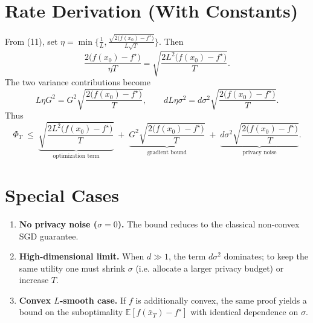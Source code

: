 \documentclass{article}
\newcommand{\E}{\mathbb{E}}
\begin{document}
\section*{Rate Derivation (With Constants)}
From (11), set $\eta = \min\big\{\frac{1}{L},\frac{\sqrt{2\big(f(x_{0})-f^{\star}\big)}}{L\sqrt{T}}\big\}$.  
Then
\[
\frac{2\big(f(x_{0})-f^{\star}\big)}{\eta T}
   = \sqrt{\frac{2L^{2}\big(f(x_{0})-f^{\star}\big)}{T}}.
\]
The two variance contributions become
\[
L\eta G^{2}= G^{2}\sqrt{ \frac{2\big(f(x_{0})-f^{\star}\big)}{T}},\qquad
dL\eta\sigma^{2}= d\sigma^{2}\sqrt{ \frac{2\big(f(x_{0})-f^{\star}\big)}{T}}.
\]
Thus
\[
\Phi_{T}\;\le\;
\underbrace{\sqrt{\frac{2L^{2}\big(f(x_{0})-f^{\star}\big)}{T}}}_{\text{optimization term}}
\;+\;
\underbrace{G^{2}\sqrt{\frac{2\big(f(x_{0})-f^{\star}\big)}{T}}}_{\text{gradient bound}}
\;+\;
\underbrace{d\sigma^{2}\sqrt{\frac{2\big(f(x_{0})-f^{\star}\big)}{T}}}_{\text{privacy noise}}.
\]

\section*{Special Cases}
\begin{enumerate}[label=\alph*)]
\item \textbf{No privacy noise ($\sigma=0$).} The bound reduces to the classical non‑convex SGD guarantee.
\item \textbf{High‑dimensional limit.} When $d\gg 1$, the term $d\sigma^{2}$ dominates; to keep the same utility one must shrink $\sigma$ (i.e. allocate a larger privacy budget) or increase $T$.
\item \textbf{Convex $L$‑smooth case.} If $f$ is additionally convex, the same proof yields a bound on the suboptimality $ \E[f(\bar{x}_{T})-f^{\star}]$ with identical dependence on $\sigma$.
\end{enumerate}
\end{document}
